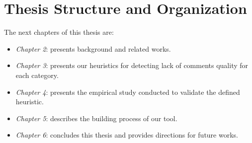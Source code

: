 \section{Thesis Structure and Organization}
The next chapters of this thesis are:

\begin{itemize}
\item \textit{Chapter 2}: presents background and related works.
\item \textit{Chapter 3}: presents our heuristics for detecting lack of comments quality for each category.
\item \textit{Chapter 4}: presents the empirical study conducted to validate the
defined heuristic.
\item \textit{Chapter 5}: describes the building process of our tool.
\item \textit{Chapter 6}: concludes this thesis and provides directions for future
works.

\end{itemize}